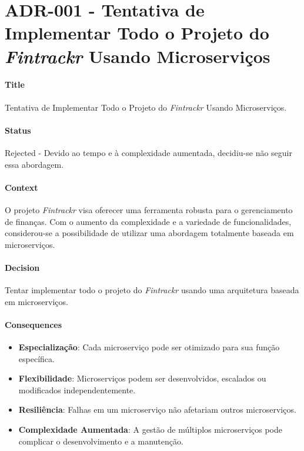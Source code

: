 
\chapter{ADR-001 - Tentativa de Implementar Todo o Projeto do \textit{Fintrackr} Usando Microserviços}
\label{apendiceADR001}

\subsubsection*{Title}
Tentativa de Implementar Todo o Projeto do \textit{Fintrackr} Usando Microserviços.

\subsubsection*{Status}
Rejected - Devido ao tempo e à complexidade aumentada, decidiu-se não seguir essa abordagem.

\subsubsection*{Context}
O projeto \textit{Fintrackr} visa oferecer uma ferramenta robusta para o gerenciamento de finanças. Com o aumento da complexidade e a variedade de funcionalidades, considerou-se a possibilidade de utilizar uma abordagem totalmente baseada em microserviços.

\subsubsection*{Decision}
Tentar implementar todo o projeto do \textit{Fintrackr} usando uma arquitetura baseada em microserviços.

\subsubsection*{Consequences}
\begin{itemize}
	\item \textbf{Especialização}: Cada microserviço pode ser otimizado para sua função específica.
	\item \textbf{Flexibilidade}: Microserviços podem ser desenvolvidos, escalados ou modificados independentemente.
	\item \textbf{Resiliência}: Falhas em um microserviço não afetariam outros microserviços.
	\item \textbf{Complexidade Aumentada}: A gestão de múltiplos microserviços pode complicar o desenvolvimento e a manutenção.
\end{itemize}
